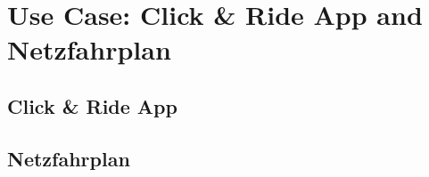 \section{Use Case: Click \& Ride App and Netzfahrplan}
\label{chap:useCases}

\subsection{Click \& Ride App}
\label{chap:CnR}

\subsection{Netzfahrplan}
\label{chap:Netzfahrplan}